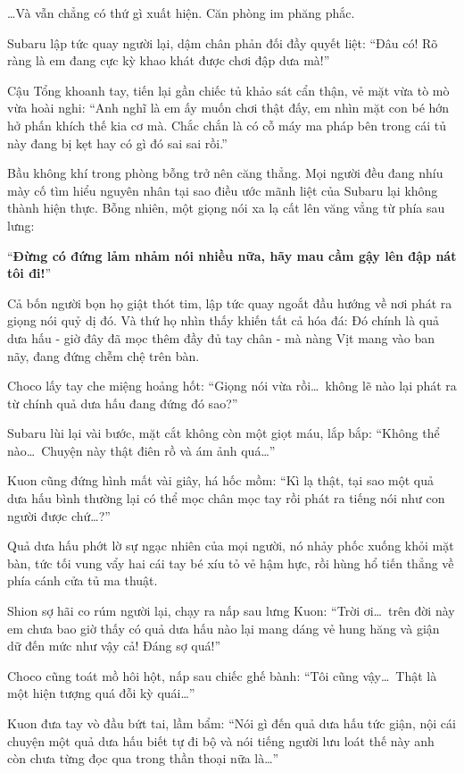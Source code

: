 \documentclass[../main.tex]{subfiles}
\begin{document}
\dots Và vẫn chẳng có thứ gì xuất hiện. Căn phòng im phăng phắc.

Subaru lập tức quay người lại, dậm chân phản đối đầy quyết liệt:
``Đâu có! Rõ ràng là em đang cực kỳ khao khát được chơi đập dưa mà!''

Cậu Tổng khoanh tay, tiến lại gần chiếc tủ khảo sát cẩn thận, vẻ mặt vừa tò mò vừa hoài nghi: ``Anh nghĩ là em ấy muốn chơi thật đấy, em nhìn mặt con bé hớn hở phấn khích thế kia cơ mà. Chắc chắn là có cỗ máy ma pháp bên trong cái tủ này đang bị kẹt hay có gì đó sai sai rồi.''

Bầu không khí trong phòng bỗng trở nên căng thẳng. Mọi người đều đang nhíu mày cố tìm hiểu nguyên nhân tại sao điều ước mãnh liệt của Subaru lại không thành hiện thực. Bỗng nhiên, một giọng nói xa lạ cất lên văng vẳng từ phía sau lưng:

``\textbf{Đừng có đứng lảm nhảm nói nhiều nữa, hãy mau cầm gậy lên đập nát tôi đi!}''


Cả bốn người bọn họ giật thót tim, lập tức quay ngoắt đầu hướng về nơi phát ra giọng nói quỷ dị đó. Và thứ họ nhìn thấy khiến tất cả hóa đá: Đó chính là quả dưa hấu - giờ đây đã mọc thêm đầy đủ tay chân - mà nàng Vịt mang vào ban nãy, đang đứng chễm chệ trên bàn.

Choco lấy tay che miệng hoảng hốt:
``Giọng nói vừa rồi\dots\ không lẽ nào lại phát ra từ chính quả dưa hấu đang đứng đó sao?''

Subaru lùi lại vài bước, mặt cắt không còn một giọt máu, lắp bắp:
``Không thể nào\dots\ Chuyện này thật điên rồ và ám ảnh quá\dots''

Kuon cũng đứng hình mất vài giây, há hốc mồm:
``Kì lạ thật, tại sao một quả dưa hấu bình thường lại có thể mọc chân mọc tay rồi phát ra tiếng nói như con người được chứ\dots?''

Quả dưa hấu phớt lờ sự ngạc nhiên của mọi người, nó nhảy phốc xuống khỏi mặt bàn, tức tối vung vẩy hai cái tay bé xíu tỏ vẻ hậm hực, rồi hùng hổ tiến thẳng về phía cánh cửa tủ ma thuật.

Shion sợ hãi co rúm người lại, chạy ra nấp sau lưng Kuon:
``Trời ơi\dots\ trên đời này em chưa bao giờ thấy có quả dưa hấu nào lại mang dáng vẻ hung hăng và giận dữ đến mức như vậy cả! Đáng sợ quá!''

Choco cũng toát mồ hôi hột, nấp sau chiếc ghế bành:
``Tôi cũng vậy\dots\ Thật là một hiện tượng quá đỗi kỳ quái\dots''

Kuon đưa tay vò đầu bứt tai, lầm bẩm:
``Nói gì đến quả dưa hấu tức giận, nội cái chuyện một quả dưa hấu biết tự đi bộ và nói tiếng người lưu loát thế này anh còn chưa từng đọc qua trong thần thoại nữa là\dots''
\end{document}
